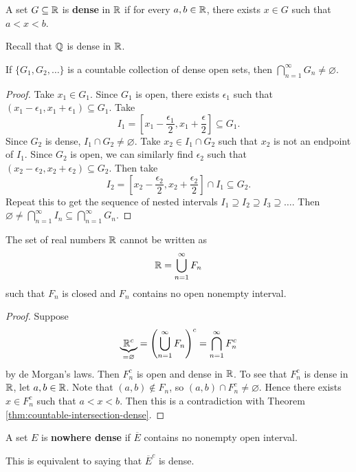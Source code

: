 \begin{definition}
  A set $G \subseteq \mathbb{R}$ is \textbf{dense} in $\mathbb{R}$ if for every
  $a, b \in \mathbb{R}$, there exists $x \in G$ such that $a < x < b$.
\end{definition}

\begin{remark}
  Recall that $\mathbb{Q}$ is dense in $\mathbb{R}$.
\end{remark}

\begin{theorem}
  \label{thm:countable-intersection-dense}
  If $\{G_1, G_2, \dots\}$ is a countable collection of dense
  open sets, then
  $\bigcap_{n = 1}^\infty G_n \ne \varnothing$.
\end{theorem}

\begin{proof}
  Take $x_1 \in G_1$. Since $G_1$ is open, there exists
  $\epsilon_1$ such that
  $(x_1 - \epsilon_1, x_1 + \epsilon_1) \subseteq G_1$.
  Take
  \[I_1 = \left[x_1 - \frac{\epsilon_1}{2}, x_1 + \frac{\epsilon}{2}\right] \subseteq G_1.\]
  Since $G_2$ is dense, $I_1 \cap G_2 \ne \varnothing$.
  Take $x_2 \in I_1 \cap G_2$ such that $x_2$ is not an
  endpoint of $I_1$. Since $G_2$ is open,
  we can similarly find $\epsilon_2$ such that
  $(x_2 - \epsilon_2, x_2 + \epsilon_2) \subseteq G_2$.
  Then take
  \[I_2 = \left[x_2 - \frac{\epsilon_2}{2}, x_2 + \frac{\epsilon_2}{2}\right] \cap I_1 \subseteq G_2.\]
  Repeat this to get the sequence of nested intervals
  $I_1 \supseteq I_2 \supseteq I_3 \supseteq \dots$. Then
  $\varnothing \ne \bigcap_{n = 1}^\infty I_n \subseteq \bigcap_{n = 1}^\infty G_n$.
\end{proof}

\begin{corollary}
  The set of real numbers $\mathbb{R}$ cannot be written as
  \[\mathbb{R} = \bigcup_{n = 1}^\infty F_n\]
  such that $F_n$ is closed and $F_n$ contains no open nonempty
  interval.
\end{corollary}

\begin{proof}
  Suppose
  \[\underbrace{\mathbb{R}^c}_{= \varnothing} = \left(\bigcup_{n = 1}^\infty F_n\right)^c = \bigcap_{n = 1}^\infty F_n^c\]
  by de Morgan's laws. Then $F_n^c$ is open and dense in $\mathbb{R}$. To
  see
  that $F_n^c$ is dense in $\mathbb{R}$, let $a, b \in \mathbb{R}$. Note that
  $(a, b) \notin F_n$, so $(a, b) \cap F_n^c \ne \varnothing$.
  Hence there exists $x \in F_n^c$ such that $a < x < b$. Then
  this is a contradiction with Theorem
  \ref{thm:countable-intersection-dense}.
\end{proof}

\begin{definition}
  A set $E$ is \textbf{nowhere dense} if $\overline{E}$ contains no
  nonempty open interval.
\end{definition}

\begin{remark}
  This is equivalent to saying that $\overline{E}^c$ is dense.
\end{remark}
